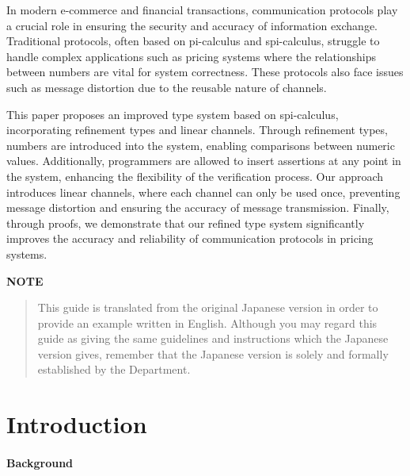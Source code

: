 \documentclass[master,english]{kuisthesis}
\date{February 12th, 2019}
\begin{document}
\maketitle					%

\begin{eabstract}				%
In modern e-commerce and financial transactions, communication protocols play a crucial role in ensuring the security and accuracy of information exchange. Traditional protocols, often based on pi-calculus and spi-calculus, struggle to handle complex applications such as pricing systems where the relationships between numbers are vital for system correctness. These protocols also face issues such as message distortion due to the reusable nature of channels.

This paper proposes an improved type system based on spi-calculus, incorporating refinement types and linear channels. Through refinement types, numbers are introduced into the system, enabling comparisons between numeric values. Additionally, programmers are allowed to insert assertions at any point in the system, enhancing the flexibility of the verification process. Our approach introduces linear channels, where each channel can only be used once, preventing message distortion and ensuring the accuracy of message transmission. Finally, through proofs, we demonstrate that our refined type system significantly improves the accuracy and reliability of communication protocols in pricing systems.

\par\bigskip\centerline{\bf NOTE}
\begin{quote}
  This guide is translated from the original Japanese version in order
  to provide an example written in English.  Although you may regard
  this guide as giving the same guidelines and instructions which the
  Japanese version gives, remember that the Japanese version is solely
  and formally established by the Department.
\end{quote}
\end{eabstract}



\tableofcontents				%

\section{Introduction}\label{sec-intro}	

\paragraph{Background}
\end{document}
